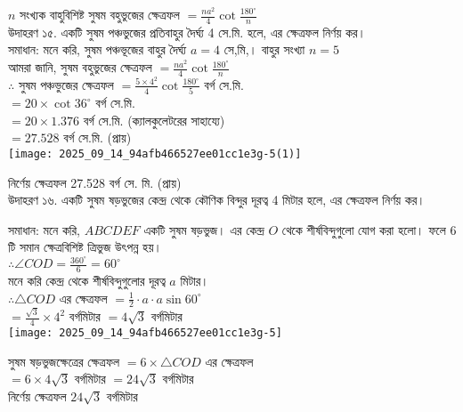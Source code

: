 \documentclass[10pt]{article}
\begin{document}
\(n\) সংখ্যক বাহুবিশিষ্ট সুষম বহুভুজের ক্ষেত্রফল \(=\frac{n a^{2}}{4} \cot \frac{180^{\circ}}{n}\)\\
উদাহরণ ১৫. একটি সুষম পঞ্চভুজের প্রতিবাহুর দৈর্ঘ্য 4 সে.মি. হলে, এর ক্ষেত্রফল নির্ণয় কর।\\
সমাধান: মনে করি, সুষম পঞ্চভূজের বাহুর দৈর্ঘ্য \(a=4\) সে,মি,। বাহুর সংখ্যা \(n=5\)\\
আমরা জানি, সুষম বহুভুজের ক্ষেত্রফল \(=\frac{n a^{2}}{4} \cot \frac{180^{\circ}}{n}\)\\
\(\therefore\) সুষম পঞ্চভুজের ক্ষেত্রফল \(=\frac{5 \times 4^{2}}{4} \cot \frac{180^{\circ}}{5}\) বর্গ সে.মি.\\
\(=20 \times \cot 36^{\circ}\) বর্গ সে.মি.\\
\(=20 \times 1.376\) বর্গ সে.মি. (ক্যালকুলেটরের সাহায্যে)\\
\(=27.528\) বর্গ সে.মি. (প্রায়)\\
\texttt{[image: 2025\_09\_14\_94afb466527ee01cc1e3g-5(1)]}

নির্ণেয় ক্ষেত্রফল 27.528 বর্গ সে. মি. (প্রায়)\\
উদাহরণ ১৬. একটি সুষম ষড়ভুজের কেন্দ্র থেকে কৌণিক বিন্দুর দূরত্ব 4 মিটার হলে, এর ক্ষেত্রফল নির্ণয় কর।

সমাধান: মনে করি, \(A B C D E F\) একটি সুষম ষড়ভুজ। এর কেন্দ্র \(O\) থেকে শীর্ষবিন্দুগুলো যোগ করা হলো। ফলে 6 টি সমান ক্ষেত্রবিশিষ্ট ত্রিভুজ উৎপন্ন হয়।\\
\(\therefore \angle C O D=\frac{360^{\circ}}{6}=60^{\circ}\)\\
মনে করি কেন্দ্র থেকে শীর্ষবিন্দুগুলোর দূরত্ব \(a\) মিটার।\\
\(\therefore \triangle C O D\) এর ক্ষেত্রফল \(=\frac{1}{2} \cdot a \cdot a \sin 60^{\circ}\)\\
\(=\frac{\sqrt{3}}{4} \times 4^{2}\) বর্গমিটার \(=4 \sqrt{3}\) বর্গমিটার\\
\texttt{[image: 2025\_09\_14\_94afb466527ee01cc1e3g-5]}

সুষম ষড়ভুজক্ষেত্রের ক্ষেত্রফল \(=6 \times \triangle C O D\) এর ক্ষেত্রফল\\
\(=6 \times 4 \sqrt{3}\) বর্গমিটার \(=24 \sqrt{3}\) বর্গমিটার\\
নির্ণেয় ক্ষেত্রফল \(24 \sqrt{3}\) বর্গমিটার
\end{document}
